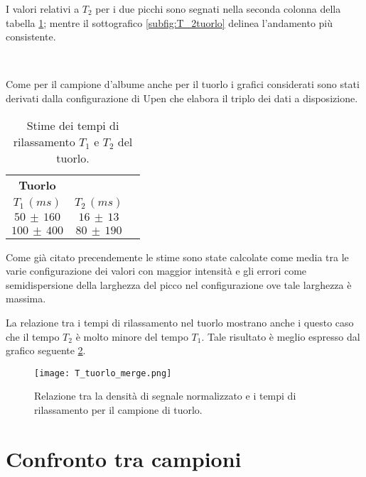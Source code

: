 I valori relativi a $T_2$ per i due picchi sono segnati nella seconda colonna della tabella \ref{tab:Tuorlo}; mentre il sottografico \ref{subfig:T_2tuorlo} delinea l'andamento più consistente.

\begin{figure}[h]
\centering
{} \quad
{} \\
\caption{}
\label{fig:T_tuorlo}
\end{figure}

Come per il campione d'albume anche per il tuorlo i grafici considerati sono stati derivati dalla configurazione di Upen che elabora il triplo dei dati a disposizione.

\begin{table}[h]
	\centering
	\begin{tabular}{ccc}
	\toprule
					\textbf{Tuorlo}	\\
		$T_1\,(ms)$ 		& 		$T_2\,(ms)$ 		\\	
	\midrule
		$50\,\pm\,160$	&		$16\,\pm\,13$		\\
		$100\,\pm\,400$		&		$80\,\pm\,190$		\\
	\bottomrule
	\end{tabular}
	\caption{Stime dei tempi di rilassamento $T_1$ e $T_2$ del tuorlo.}	
	\label{tab:Tuorlo}
\end{table}

Come già citato precendemente le stime sono state calcolate come media tra le varie configurazione dei valori con maggior intensità e gli errori come semidispersione della larghezza del picco nel configurazione ove tale larghezza è massima.

La relazione tra i tempi di rilassamento nel tuorlo mostrano anche i questo caso che il tempo $T_2$ è molto minore del tempo $T_1$. 
Tale risultato è meglio espresso dal grafico seguente \ref{fig:Tuorlo}.

\begin{figure}[h]
\centering
\texttt{[image: T\_tuorlo\_merge.png]}
\caption{Relazione tra la densità di segnale normalizzato e i tempi di rilassamento per il campione di tuorlo.}
\label{fig:Tuorlo}
\end{figure}


\section*{Confronto tra campioni}

